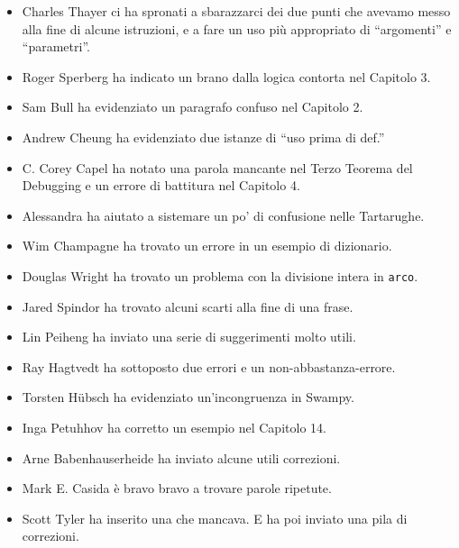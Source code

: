 \documentclass[10pt]{book}
\begin{document}
\begin{itemize}
\item Charles Thayer ci ha spronati a sbarazzarci dei due punti che avevamo messo alla fine di alcune istruzioni, e a fare un uso più appropriato di ``argomenti'' e ``parametri''.

\item Roger Sperberg ha indicato un brano dalla logica contorta nel Capitolo 3.

\item Sam Bull ha evidenziato un paragrafo confuso nel Capitolo 2.

\item Andrew Cheung ha evidenziato due istanze di ``uso prima di def.''

\item C. Corey Capel ha notato una parola mancante nel Terzo Teorema del Debugging e un errore di battitura nel Capitolo 4.

\item Alessandra ha aiutato a sistemare un po' di confusione nelle Tartarughe.

\item Wim Champagne ha trovato un errore in un esempio di dizionario.

\item Douglas Wright ha trovato un problema con la divisione intera in
{\tt arco}.

\item Jared Spindor ha trovato alcuni scarti alla fine di una frase.

\item Lin Peiheng ha inviato una serie di suggerimenti molto utili.

\item Ray Hagtvedt ha sottoposto due errori e un non-abbastanza-errore.

\item Torsten H\"{u}bsch ha evidenziato un'incongruenza in Swampy.

\item Inga Petuhhov ha corretto un esempio nel Capitolo 14.

\item Arne Babenhauserheide ha inviato alcune utili correzioni.

\item Mark E. Casida è bravo bravo a trovare parole ripetute.

\item Scott Tyler ha inserito una che mancava. E ha poi inviato una pila di correzioni.


\end{itemize}
\end{document}
